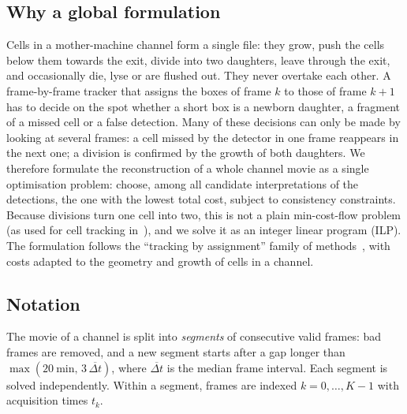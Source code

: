 \documentclass[11pt,a4paper]{article}
\begin{document}
\subsection{Why a global formulation}
Cells in a mother-machine channel form a single file: they grow, push the cells below them towards the exit, divide into two daughters, leave through the exit, and occasionally die, lyse or are flushed out. They never overtake each other. A frame-by-frame tracker that assigns the boxes of frame $k$ to those of frame $k+1$ has to decide on the spot whether a short box is a newborn daughter, a fragment of a missed cell or a false detection. Many of these decisions can only be made by looking at several frames: a cell missed by the detector in one frame reappears in the next one; a division is confirmed by the growth of both daughters. We therefore formulate the reconstruction of a whole channel movie as a single optimisation problem: choose, among all candidate interpretations of the detections, the one with the lowest total cost, subject to consistency constraints. Because divisions turn one cell into two, this is not a plain min-cost-flow problem (as used for cell tracking in~\cite{padfield2011}), and we solve it as an integer linear program (ILP). The formulation follows the ``tracking by assignment'' family of methods~\cite{jug2014,schiegg2013}, with costs adapted to the geometry and growth of cells in a channel.

\subsection{Notation}
The movie of a channel is split into \emph{segments} of consecutive valid frames: bad frames are removed, and a new segment starts after a gap longer than $\max(\SI{20}{\minute},\,3\,\overline{\Delta t})$, where $\overline{\Delta t}$ is the median frame interval. Each segment is solved independently. Within a segment, frames are indexed $k=0,\dots,K-1$ with acquisition times $t_k$.
\end{document}
